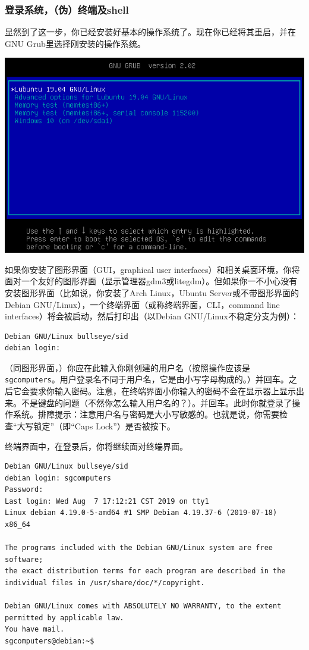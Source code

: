 \subsubsection{登录系统，（伪）终端及shell} 
\cite{intro1}\par
显然到了这一步，你已经安装好基本的操作系统了。现在你已经将其重启，并在GNU Grub里选择刚安装的操作系统。
\begin{center}
	\includegraphics[scale=0.6]{pic/lubstart}
\end{center} \par
如果你安装了图形界面（GUI，graphical user interfaces）和相关桌面环境，你将面对一个友好的图形界面（显示管理器gdm3或litegdm）。但如果你一不小心没有安装图形界面（比如说，你安装了Arch Linux，Ubuntu Server或不带图形界面的Debian GNU/Linux），一个终端界面（或称终端界面，CLI，command line interfaces）将会被启动，然后打印出（以Debian GNU/Linux不稳定分支为例）：
\begin{verbatim}
Debian GNU/Linux bullseye/sid
debian login:
\end{verbatim} \par
（同图形界面，）你应在此输入你刚创建的用户名（按照操作应该是\verb|sgcomputers|。用户登录名不同于用户名，它是由小写字母构成的。）并回车。之后它会要求你输入密码。注意，在终端界面小你输入的密码不会在显示器上显示出来。不是键盘的问题（不然你怎么输入用户名的？）。并回车。此时你就登录了操作系统。排障提示：注意用户名与密码是大小写敏感的。也就是说，你需要检查“大写锁定”（即“Caps Lock”）是否被按下。\par
终端界面中，在登录后，你将继续面对终端界面。
\begin{verbatim}
Debian GNU/Linux bullseye/sid
debian login: sgcomputers
Password:
Last login: Wed Aug  7 17:12:21 CST 2019 on tty1
Linux debian 4.19.0-5-amd64 #1 SMP Debian 4.19.37-6 (2019-07-18) x86_64

The programs included with the Debian GNU/Linux system are free software;
the exact distribution terms for each program are described in the
individual files in /usr/share/doc/*/copyright.

Debian GNU/Linux comes with ABSOLUTELY NO WARRANTY, to the extent
permitted by applicable law.
You have mail.
sgcomputers@debian:~$
\end{verbatim}
